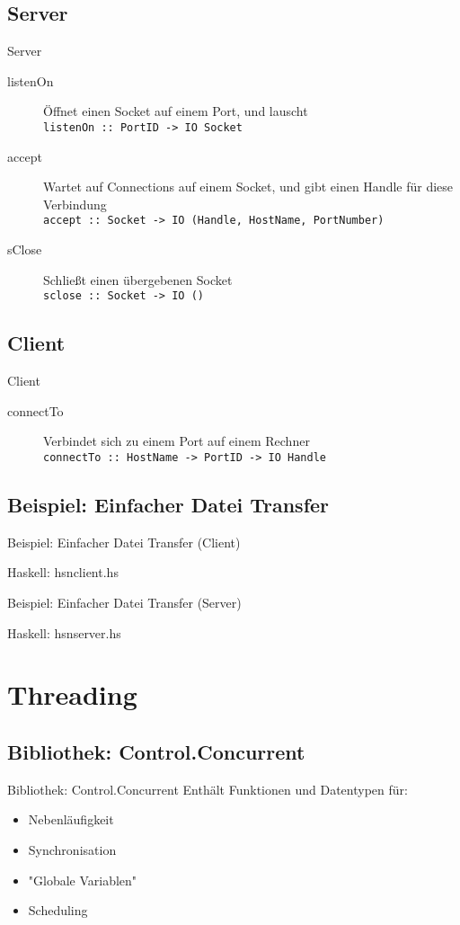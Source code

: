 \documentclass{beamer}
\newcommand{\code}[2]
{
	\begin{block}{#1: #2}
	
	\end{block}
}
\begin{document}
\subsection{Server}
\begin{frame}[<+->]{Server}
\begin{description}
\item[listenOn] Öffnet einen Socket auf einem Port, und lauscht \\ \texttt{listenOn :: PortID -> IO Socket}
\item[accept] Wartet auf Connections auf einem Socket, und gibt einen Handle für diese Verbindung \\ \texttt{accept :: Socket -> IO (Handle, HostName, PortNumber)}
\item[sClose] Schließt einen übergebenen Socket \\ \texttt{sclose :: Socket -> IO ()}
\end{description}
\end{frame}

\subsection{Client}
\begin{frame}{Client}
\begin{description}
\item[connectTo] Verbindet sich zu einem Port auf einem Rechner \\ \texttt{connectTo :: HostName -> PortID -> IO Handle}
\end{description}
\end{frame}

\subsection{Beispiel: Einfacher Datei Transfer}
\begin{frame}{Beispiel: Einfacher Datei Transfer (Client)}
\tiny
\code{Haskell}{hsnclient.hs}
\end{frame}

\begin{frame}{Beispiel: Einfacher Datei Transfer (Server)}
\tiny
\code{Haskell}{hsnserver.hs}
\end{frame}

\section{Threading}
\subsection{Bibliothek: Control.Concurrent}
\begin{frame}[<+->]{Bibliothek: Control.Concurrent}
Enthält Funktionen und Datentypen für:
\begin{itemize}
\item Nebenläufigkeit
\item Synchronisation
\item "Globale Variablen"
\item Scheduling
\end{itemize}
\end{frame}
\end{document}
